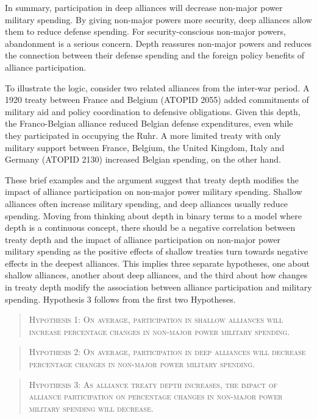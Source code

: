\documentclass[12pt]{article}
\begin{document}
In summary, participation in deep alliances will decrease non-major power military spending.
By giving non-major powers more security, deep alliances allow them to reduce defense spending. 
For security-conscious non-major powers, abandonment is a serious concern. 
Depth reassures non-major powers and reduces the connection between their defense spending and the foreign policy benefits of alliance participation. 


To illustrate the logic, consider two related alliances from the inter-war period. 
A 1920 treaty between France and Belgium (ATOPID 2055) added commitments of military aid and policy coordination to defensive obligations. 
Given this depth, the Franco-Belgian alliance reduced Belgian defense expenditures, even while they participated in occupying the Ruhr. 
A more limited treaty with only military support between France, Belgium, the United Kingdom, Italy and Germany (ATOPID 2130) increased Belgian spending, on the other hand.   
 
 
These brief examples and the argument suggest that treaty depth modifies the impact of alliance participation on non-major power military spending. 
Shallow alliances often increase military spending, and deep alliances usually reduce spending.  
Moving from thinking about depth in binary terms to a model where depth is a continuous concept, there should be a negative correlation between treaty depth and the impact of alliance participation on non-major power military spending as the positive effects of shallow treaties turn towards negative effects in the deepest alliances. 
This implies three separate hypotheses, one about shallow alliances, another about deep alliances, and the third about how changes in treaty depth modify the association between alliance participation and military spending. 
Hypothesis 3 follows from the first two Hypotheses. 
 

\begin{quote}
\textsc{Hypothesis 1: On average, participation in shallow alliances will increase percentage changes in non-major power military spending.}
\end{quote}

\begin{quote}
\textsc{Hypothesis 2: On average, participation in deep alliances will decrease percentage changes in non-major power military spending.}
\end{quote}

\begin{quote}
\textsc{Hypothesis 3: As alliance treaty depth increases, the impact of alliance participation on percentage changes in non-major power military spending will decrease.}
\end{quote}
\end{document}

